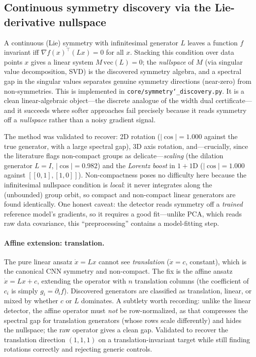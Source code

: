 \documentclass[11pt]{article}
\newcommand{\allowbreakhere}{\discretionary{}{}{}}
\newcommand{\code}[1]{\texttt{\def\_{\char`_\allowbreakhere}#1}}
\begin{document}
\subsection{Continuous symmetry discovery via the Lie-derivative nullspace}
\label{sec:liediscovery}

A continuous (Lie) symmetry with infinitesimal generator $L$ leaves a function $f$ invariant iff
$\nabla f(x)^\top (Lx)=0$ for all $x$. Stacking this condition over data points $x$ gives a linear
system $M\,\mathrm{vec}(L)=0$; the \emph{nullspace} of $M$ (via singular value decomposition, SVD) is the discovered symmetry
algebra, and a spectral gap in the singular values separates genuine symmetry directions
(near-zero) from non-symmetries. This is implemented in \code{core/symmetry\_discovery.py}. It is a
clean linear-algebraic object---the discrete analogue of the width dual certificate---and it
succeeds where softer approaches fail precisely because it reads symmetry off a \emph{nullspace}
rather than a noisy gradient signal.

The method was validated to recover: 2D rotation ($|\cos|=1.000$ against the true generator, with a
large spectral gap), 3D axis rotation, and---crucially, since the literature flags non-compact
groups as delicate---\emph{scaling} (the dilation generator $L=I$, $|\cos|=0.982$) and the
\emph{Lorentz boost} in $1{+}1$D ($|\cos|=1.000$ against $[[0,1],[1,0]]$). Non-compactness poses no
difficulty here because the infinitesimal nullspace condition is \emph{local}: it never integrates
along the (unbounded) group orbit, so compact and non-compact linear generators are found
identically. One honest caveat: the detector reads symmetry off a \emph{trained} reference model's
gradients, so it requires a good fit---unlike PCA, which reads raw data covariance, this
``preprocessing'' contains a model-fitting step.

\paragraph{Affine extension: translation.} The pure linear ansatz $\dot x = Lx$ cannot see
\emph{translation} ($\dot x = c$, constant), which is the canonical CNN symmetry and non-compact.
The fix is the affine ansatz $\dot x = Lx + c$, extending the operator with $n$ translation columns
(the coefficient of $c_i$ is simply $g_i=\partial_i f$). Discovered generators are classified as
translation, linear, or mixed by whether $c$ or $L$ dominates. A subtlety worth recording: unlike
the linear detector, the affine operator must \emph{not} be row-normalized, as that compresses the
spectral gap for translation generators (whose rows scale differently) and hides the nullspace; the
raw operator gives a clean gap. Validated to recover the translation direction $(1,1,1)$ on a
translation-invariant target while still finding rotations correctly and rejecting generic
controls.
\end{document}
